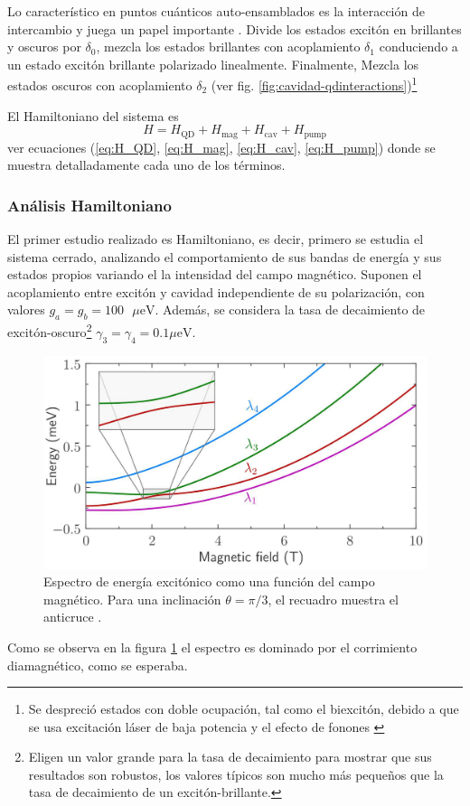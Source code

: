 \documentclass[../main.tex]{subfiles}
\begin{document}
Lo característico en puntos cuánticos auto-ensamblados es la interacción de intercambio y juega un papel importante \parencite{Bayer2002}. Divide los estados excitón en brillantes y oscuros por $\delta_0$, mezcla los estados brillantes con acoplamiento $\delta_1$ conduciendo a un estado excitón brillante polarizado linealmente. Finalmente, Mezcla los estados oscuros con acoplamiento $\delta_2$ (ver fig. \ref{fig:cavidad-qdinteractions})\footnote{Se despreció estados con doble ocupación, tal como el biexcitón, debido a que se usa excitación láser de baja potencia y el efecto de fonones \parencite{Lüker2017}}

El Hamiltoniano del sistema es
\begin{equation}
	H = H_\text{QD} + H_\text{mag} + H_\text{cav} + H_\text{pump}
\end{equation}
ver ecuaciones (\ref{eq:H_QD}, \ref{eq:H_mag}, \ref{eq:H_cav}, \ref{eq:H_pump}) donde se muestra detalladamente cada uno de los términos.

\subsubsection{Análisis Hamiltoniano}

El primer estudio realizado es Hamiltoniano, es decir, primero se estudia el sistema cerrado, analizando el comportamiento de sus bandas de energía y sus estados propios variando el la intensidad del campo magnético. Suponen el acoplamiento entre excitón y cavidad independiente de su polarización, con valores $g_a = g_b = 100\text{ $\mu$eV}$. Además, se considera la tasa de decaimiento de excitón-oscuro\footnote{Eligen un valor grande para la tasa de decaimiento para mostrar que sus resultados son robustos, los valores típicos son mucho más pequeños que la tasa de decaimiento de un excitón-brillante.} $\gamma_3 = \gamma_4 = 0.1\text{$\mu$eV}$.

\begin{figure}[th]
	\centering
	\includegraphics[width=0.6\linewidth]{img/EnergyExcitonesMagnetic}
	\caption{Espectro de energía excitónico como una función del campo magnético. Para una inclinación $\theta = \pi/3$, el recuadro muestra el anticruce \parencite{Jimenez2017}.}
	\label{fig:energyexcitonesmagnetic}
\end{figure}
Como se observa en la figura \ref{fig:energyexcitonesmagnetic} el espectro es dominado por el corrimiento diamagnético, como se esperaba.
\end{document}

